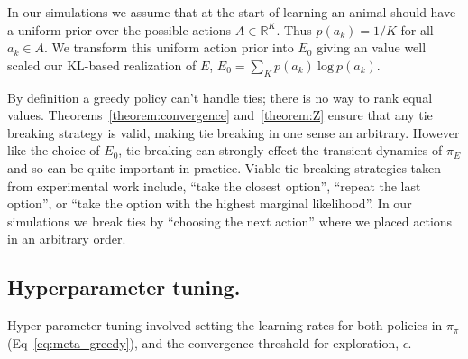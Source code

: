 \documentclass[9pt,twocolumn,twoside]{pnas-new}
\begin{document}
In our simulations we assume that at the start of learning an animal should have a uniform prior over the possible actions $A \in \mathbb{R}^K$. Thus $p(a_k) = 1/K$ for all $a_k \in A$. We transform this uniform action prior into $E_0$ giving an value well scaled our KL-based realization of $E$, $E_0 = \sum_K p(a_k)\ \text{log}\ p(a_k)$. 

By definition a greedy policy can't handle ties; there is no way to rank equal values. Theorems~\ref{theorem:convergence} and~\ref{theorem:Z} ensure that any tie breaking strategy is valid, making tie breaking in one sense an arbitrary. However like the choice of $E_0$, tie breaking can strongly effect the transient dynamics of $\pi_E$ and so can be quite important in practice. Viable tie breaking strategies taken from experimental work include, ``take the closest option'', ``repeat the last option'', or ``take the option with the highest marginal likelihood''. In our simulations we break ties by ``choosing the next action'' where we placed actions in an arbitrary order.

\subsection*{Hyperparameter tuning.}
Hyper-parameter tuning involved setting the learning rates for both policies in $\pi_{\pi}$ (Eq~\ref{eq:meta_greedy}), and the convergence threshold for exploration, $\epsilon$. 
\end{document}
